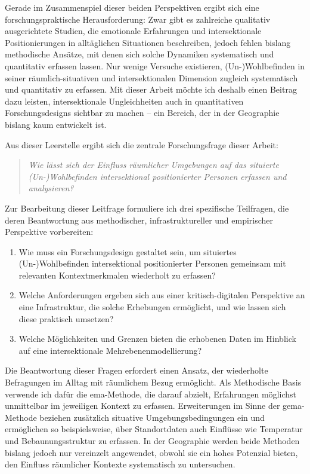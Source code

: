 Gerade im Zusammenspiel dieser beiden Perspektiven ergibt sich eine forschungspraktische Herausforderung: Zwar gibt es zahlreiche qualitativ ausgerichtete Studien, die emotionale Erfahrungen und intersektionale Positionierungen in alltäglichen Situationen beschreiben, jedoch fehlen bislang methodische Ansätze, mit denen sich solche Dynamiken systematisch und quantitativ erfassen lassen. Nur wenige Versuche existieren,  (Un-)Wohlbefinden in seiner räumlich-situativen und intersektionalen Dimension zugleich systematisch und quantitativ zu erfassen. Mit dieser Arbeit möchte ich deshalb einen Beitrag dazu leisten, intersektionale Ungleichheiten auch in quantitativen Forschungsdesigns sichtbar zu machen -- ein Bereich, der in der Geographie bislang kaum entwickelt ist.

\vspace{1em}

Aus dieser Leerstelle ergibt sich die zentrale Forschungsfrage dieser Arbeit:
\begin{quote}
\emph{Wie lässt sich der Einfluss räumlicher Umgebungen auf das situierte (Un-)Wohlbefinden intersektional positionierter Personen erfassen und analysieren?}
\end{quote}

Zur Bearbeitung dieser Leitfrage formuliere ich drei spezifische Teilfragen, die deren Beantwortung aus methodischer, infrastruktureller und empirischer Perspektive vorbereiten:

\begin{enumerate}
    \item Wie muss ein Forschungsdesign gestaltet sein, um situiertes (Un-)Wohlbefinden intersektional positionierter Personen gemeinsam mit relevanten Kontextmerkmalen wiederholt zu erfassen?
    \item Welche Anforderungen ergeben sich aus einer kritisch-digitalen Perspektive an eine Infrastruktur, die solche Erhebungen ermöglicht, und wie lassen sich diese praktisch umsetzen?
    \item Welche Möglichkeiten und Grenzen bieten die erhobenen Daten im Hinblick auf eine intersektionale Mehrebenenmodellierung?
\end{enumerate}

Die Beantwortung dieser Fragen erfordert einen Ansatz, der wiederholte Befragungen im Alltag mit räumlichem Bezug ermöglicht. Als Methodische Basis verwende ich dafür die \gls{ema}-Methode, die darauf abzielt, Erfahrungen möglichst unmittelbar im jeweiligen Kontext zu erfassen. Erweiterungen im Sinne der \gls{gema}-Methode beziehen zusätzlich situative Umgebungsbedingungen ein und ermöglichen so beispielsweise, über Standortdaten auch Einflüsse wie Temperatur und Bebaunungsstruktur zu erfassen. In der Geographie werden beide Methoden bislang jedoch nur vereinzelt angewendet, obwohl sie ein hohes Potenzial bieten, den Einfluss räumlicher Kontexte systematisch zu untersuchen.

